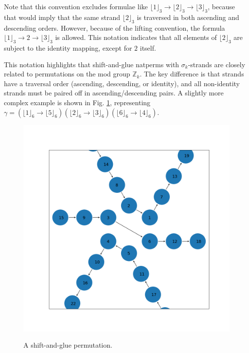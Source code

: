 \documentclass[12pt,reqno]{article}
\begin{document}
Note that this convention excludes formulae like ${\lfloor 1 \rfloor}_3 \rightarrow {\lfloor 2 \rfloor}_3 \rightarrow {\lfloor 3 \rfloor}_3$, because that would imply that the same strand ${\lfloor 2 \rfloor}_3$ is traversed in both ascending and descending orders. However, because of the lifting convention, the formula ${\lfloor 1 \rfloor}_3 \rightarrow 2 \rightarrow {\lfloor 3 \rfloor}_3$ is allowed. This notation indicates that all elements of ${\lfloor 2 \rfloor}_3$ are subject to the identity mapping, except for $2$ itself.

This notation highlights that shift-and-glue natperms with $\sigma_k$-strands are closely related to permutations on the mod group $\mathbb{Z}_{k}$. The key difference is that strands have a traversal order (ascending, descending, or identity), and all non-identity strands must be paired off in ascending/descending pairs. A slightly more complex example is shown in Fig. \ref{fig:shiftandglue}, representing $\gamma = ( \lfloor 1 \rfloor_6 \rightarrow \lfloor 5 \rfloor_6 ) ( \lfloor 2 \rfloor_6 \rightarrow \lfloor 3 \rfloor_6 ) ( \lfloor 6 \rfloor_6 \rightarrow \lfloor 4 \rfloor_6 )$.

\begin{figure}
  \includegraphics[width=\linewidth]{figs/fig1.png}
  \label{fig:shiftandglue}
  \caption{A shift-and-glue permutation.}
  \label{fig:shiftandglue}
\end{figure}
\end{document}
